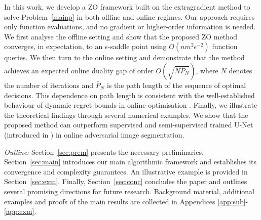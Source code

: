 \documentclass{article}
\theoremstyle{plain}
\theoremstyle{definition}
\theoremstyle{remark}
\begin{document}
In this work, we develop a ZO framework built on the extragradient
method to solve Problem~\ref{mainp} in both offline and online regimes.
Our
approach requires only function evaluations, and no gradient or higher-order information is needed.
We first analyse the offline setting and show that the proposed ZO method converges, in expectation, to an $\epsilon$-saddle point using $O(nm^2 \epsilon^{-2})$ function queries. 
We then turn to the online setting and demonstrate that the method achieves an expected online duality gap of order $O(\sqrt{N \bar{P}_N})$, where $N$ denotes the number of iterations 
and $\bar{P}_N$ is the path length of the sequence of optimal decisions. 
This dependence on path length is consistent with the well-established behaviour of dynamic regret bounds in online optimisation \cite{zinkevich2003online,hazan2016introduction}. Finally, we illustrate the theoretical findings through several numerical examples. We show that the proposed method can outperform supervised and semi-supervised trained U-Net (introduced in \cite{ronneberger2015u}) in online adversarial image segmentation. 


\noindent\emph{Outline:} %
Section~\ref{sec:prem} presents the necessary preliminaries. 
Section~\ref{sec:main} introduces our main algorithmic framework and establishes its convergence and complexity guarantees. 
An illustrative example is provided in Section~\ref{sec:exm}. 
Finally, Section~\ref{sec:conc} concludes the paper and outlines several promising directions for future research. Background material, additional examples and proofs of the main results are collected in Appendices \ref{app:sub}-\ref{app:exm}.
\end{document}
